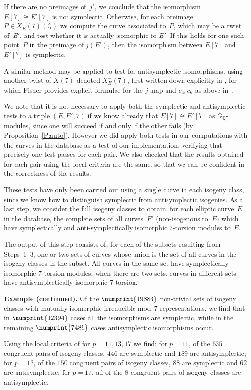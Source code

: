 \documentclass[12pt, reqno]{amsart}
\newcommand{\Q}{\mathbb{Q}}
\numberwithin{equation}{section}
\theoremstyle{definition}
\theoremstyle{remark}
\begin{document}
If there are no preimages of~$j'$, we conclude that the isomorphism
$E[7]\cong E'[7]$ is not symplectic.  Otherwise, for each preimage
$P\in X_E(7)(\Q)$ we compute the curve associated to~$P$, which may be
a twist of~$E'$, and test whether it is actually isomorphic to $E'$.
If this holds for one such point~$P$ in the preimage of $j(E')$, then
the isomorphism between $E[7]$ and $E'[7]$ is symplectic.

A similar method may be applied to test for antisymplectic
isomorphisms, using another twist of $X(7)$ denoted $X_E^-(7)$, first
written down explicitly in \cite{PSS}, for which Fisher provides
explicit formulae for the $j$-map and $c_4,c_6$ as above
in~\cite{Fisher}.

We note that it is not necessary to apply both the symplectic and
antisymplectic tests to a triple $(E,E',7)$ if we know already that
$E[7]\cong E'[7]$ as $G_\Q$-modules, since one will succeed if and only if the other
fails (by Proposition~\ref{P:auto}).  However we did apply both
tests in our computations with the curves in the database as a test of
our implementation, verifying that precisely one test passes for each
pair.  We also checked that the results obtained for each pair using
the local criteria are the same, so that we can be confident in the
correctness of the results.

These tests have only been carried out using a single curve in each
isogeny class, since we know how to distinguish symplectic from
antisymplectic isogenies.  As a last step, we consider the full isogeny classes
to obtain, for each elliptic curve~$E$ in the database, the complete sets of all curves~$E'$ (non-isogenous to~$E$) which have
symplectically and anti-symplectically isomorphic $7$-torsion modules to~$E$.

The output of this step consists of, for each of the subsets resulting
from Steps~1--3, one or two sets of curves whose union is the set of
all curves in the isogeny classes in the subset.  All curves in the
same set have symplectically isomorphic 7-torsion modules; when there
are two sets, curves in different sets have antisymplectically
isomorphic 7-torsion.

{\bf Example (continued).}
Of the $\numprint{19883}$ non-trivial sets of isogeny classes with mutually
isomorphic irreducible mod~$7$ representations, we find that in
$\numprint{12394}$ cases all the isomorphisms are symplectic, while in the
remaining $\numprint{7489}$ cases antisymplectic isomorphisms occur.

Using the local criteria of \cite{FKSym} for $p=11, 13, 17$ we find:
for $p=11$, of the $635$ congruent pairs of isogeny classes, $446$ are
symplectic and $189$ are antisymplectic; for $p=13$, of the $150$
congruent pairs of isogeny classes, $88$ are symplectic and $62$ are
antisymplectic; for $p=17$, all of the $8$ congruent pairs of isogeny
classes are antisymplectic.
\end{document}
